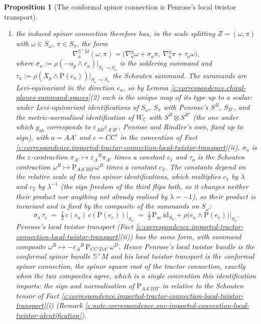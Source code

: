 \documentclass[11pt]{article}
\newtheorem{proposition}[theorem]{Proposition}
\theoremstyle{definition}
\theoremstyle{plain}
\providecommand{\C}{}\renewcommand{\C}{\mathbb{C}}
\providecommand{\CS}{}\renewcommand{\CS}{{\mathbb{S}^{+}}}
\providecommand{\Som}{}\renewcommand{\Som}{S_\omega}
\providecommand{\Spi}{}\renewcommand{\Spi}{S_\pi}
\providecommand{\id}{}\renewcommand{\id}{\mathrm{id}}
\begin{document}
\begin{proposition}[The conformal spinor connection is Penrose's local twistor transport]
\begin{enumerate}
\item the induced spinor connection therefore has, in the scale splitting $Z = (\omega, \pi)$ with $\omega \in \Som$, $\pi \in \Spi$, the form
\[
\nabla^{\CS M}_a(\omega, \pi) = \bigl(\nabla^g_a\omega + \sigma_a\pi,\ \nabla^g_a\pi + \tau_a\omega\bigr),
\]
where $\sigma_a := \rho(-u_p\wedge e_a)|_{\Spi\to\Som}$ is the soldering summand and $\tau_a := \rho(X_p\wedge\mathrm{P}(e_a))|_{\Som\to\Spi}$ the Schouten summand.
The summands are Levi-equivariant in the direction $e_a$, so by Lemma \ref{c:correspondence.chiral-planes-summand-spaces}(2) each is the unique map of its type up to a scalar: under Levi-equivariant identifications of $\Som$, $\Spi$ with Penrose's $S^B$, $S_{B'}$, and the \emph{metric-normalised} identification of $W_\C$ with $S^B\otimes S^{B'}$ (the one under which $g_{ab}$ corresponds to $\varepsilon_{AB}\varepsilon_{A'B'}$, Penrose and Rindler's own, fixed up to sign), with $a = AA'$ and $c = CC'$ in the convention of Fact \ref{c:correspondence.imported-tractor-connection-local-twistor-transport}(ii), $\sigma_a$ is the $\varepsilon$-contraction $\pi_{A'} \mapsto \varepsilon_A{}^B\pi_{A'}$ times a constant $c_1$ and $\tau_a$ is the Schouten contraction $\omega^B \mapsto \mathrm{P}_{AA'BB'}\omega^B$ times a constant $c_2$. The constants depend on the relative scale of the two spinor identifications, which multiplies $c_1$ by $\lambda$ and $c_2$ by $\lambda^{-1}$ (the sign freedom of the third flips both, so it changes neither their product nor anything not already realised by $\lambda = -1$), so their product is invariant and is fixed by the composite of the summands on $\Som$:
\[
\sigma_a\,\tau_c \;=\; \tfrac12\,c(e_a)\,c(\mathrm{P}(e_c))\big|_{\Som} \;=\; \tfrac12\,\mathrm{P}_{ac}\,\id_{\Som} + \rho\bigl(e_a\wedge\mathrm{P}(e_c)\bigr)\big|_{\Som} .
\]
Penrose's local twistor transport (Fact \ref{c:correspondence.imported-tractor-connection-local-twistor-transport}(ii)) has the same form, with summand composite $\omega^B \mapsto -\varepsilon_A{}^B\,\mathrm{P}_{CC'DA'}\,\omega^D$. Hence Penrose's local twistor bundle is the conformal spinor bundle $\CS M$ and his local twistor transport is the conformal spinor connection, the spinor square root of the tractor connection, exactly when the two composites agree, which is a single convention this identification imports: the sign and normalisation of $\mathrm{P}_{AA'BB'}$ in \cite{PenroseRindler86} relative to the Schouten tensor of Fact \ref{c:correspondence.imported-tractor-connection-local-twistor-transport}(i) (Remark \ref{c:note.correspondence.one-imported-convention-local-twistor-identification}).
\end{enumerate}
\end{proposition}
\end{document}
